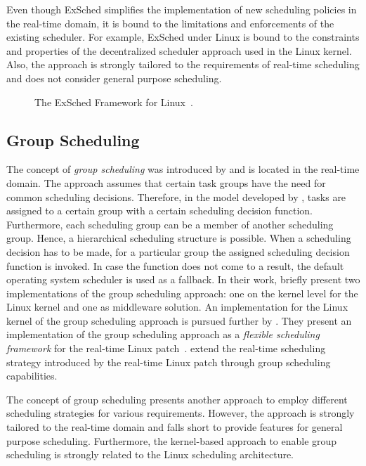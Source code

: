 Even though ExSched simplifies the implementation of new scheduling policies in the real-time domain, it is bound to the limitations and enforcements of the existing scheduler. For example, ExSched under Linux is bound to the constraints and properties of the decentralized scheduler approach used in the Linux kernel. Also, the approach is strongly tailored to the requirements of real-time scheduling and does not consider general purpose scheduling.

\begin{figure}[t!]\centering
	\caption[The ExSched Framework for Linux.]{The ExSched Framework for Linux~\cite[\pno~242(3)]{Asberg-2012-ExSched}.}%
	\label{fig:related:exsched}
\end{figure}

\subsection{Group Scheduling}

The concept of \emph{group scheduling} was introduced by \textcite{Aswathanarayana-2005-GroupScheduling} and is located in the real-time domain. The approach assumes that certain task groups have the need for common scheduling decisions. Therefore, in the model developed by \citeauthor{Aswathanarayana-2005-GroupScheduling}, tasks are assigned to a certain group with a certain scheduling decision function. Furthermore, each scheduling group can be a member of another scheduling group. Hence, a hierarchical scheduling structure is possible. When a scheduling decision has to be made, for a particular group the assigned scheduling decision function is invoked. In case the function does not come to a result, the default operating system scheduler is used as a fallback. In their work, \citeauthor{Aswathanarayana-2005-GroupScheduling} briefly present two implementations of the group scheduling approach: one on the kernel level for the Linux kernel and one as middleware solution. An implementation for the Linux kernel of the group scheduling approach is pursued further by \textcite{Watkins-2009-GroupScheduling}. They present an implementation of the group scheduling approach as a \emph{flexible scheduling framework} for the real-time Linux patch~\cite{Rostedt-2007-RTLinux,RTLinux}. \citeauthor{Watkins-2009-GroupScheduling} extend the real-time scheduling strategy introduced by the real-time Linux patch through group scheduling capabilities.

The concept of group scheduling presents another approach to employ different scheduling strategies for various requirements. However, the approach is strongly tailored to the real-time domain and falls short to provide features for general purpose scheduling. Furthermore, the kernel-based approach to enable group scheduling is strongly related to the Linux scheduling architecture.

